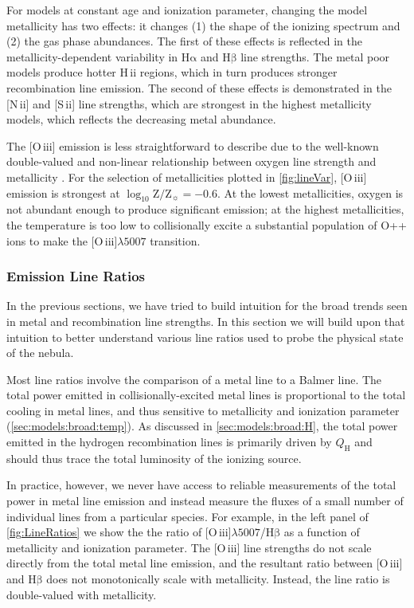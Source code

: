 \documentclass[twocolumn, tighten]{aastex61}
\newcommand{\Fig}[1]{\autoref{fig:#1}}
\newcommand{\Sec}[1]{\autoref{sec:#1}}
\newcommand{\logten}{\ensuremath{\log_{10}}}
\newcommand{\nii}{[N\,{\sc ii}]\xspace}
\newcommand{\sii}{[S\,{\sc ii}]\xspace}
\newcommand{\oiii}{[O\,{\sc iii}]\xspace}
\newcommand{\ha}{\ensuremath{\mathrm{H\alpha}}}
\newcommand{\hb}{\ensuremath{\mathrm{H\beta}}}
\newcommand{\hii}{H\,{\sc ii}\xspace}
\newcommand\lam[1]{\ensuremath{\lambda #1}}
\newcommand{\logZeq}[1]{\ensuremath{\logten \mathrm{Z}/\mathrm{Z}_{\sun} = #1}}
\newcommand{\QH}{\ensuremath{Q_{\mathrm{H}}}}
\newcommand\oiiihb{\oiii{}\lam{5007}/\hb{}}
\begin{document}
For models at constant age and ionization parameter, changing the model metallicity has two effects: it changes (1) the shape of the ionizing spectrum and (2) the gas phase abundances. The first of these effects is reflected in the metallicity-dependent variability in \ha{} and \hb{} line strengths. The metal poor models produce hotter \hii regions, which in turn produces stronger recombination line emission. The second of these effects is demonstrated in the \nii{} and \sii{} line strengths, which are strongest in the highest metallicity models, which reflects the decreasing metal abundance.

The \oiii{} emission is less straightforward to describe due to the well-known double-valued and non-linear relationship between oxygen line strength and metallicity \citep{Pilyugin05, Kewley08}. For the selection of metallicities plotted in \Fig{lineVar}, \oiii{} emission is strongest at \logZeq{-0.6}. At the lowest metallicities, oxygen is not abundant enough to produce significant emission; at the highest metallicities, the temperature is too low to collisionally excite a substantial population of O++ ions to make the \oiii{}\lam{5007} transition. 

\subsubsection{Emission Line Ratios}\label{sec:models:lines:ratios}

In the previous sections, we have tried to build intuition for the broad trends seen in metal and recombination line strengths. In this section we will build upon that intuition to better understand various line ratios used to probe the physical state of the nebula.

Most line ratios involve the comparison of a metal line to a Balmer line. The total power emitted in collisionally-excited metal lines is proportional to the total cooling in metal lines, and thus sensitive to metallicity and ionization parameter (\Sec{models:broad:temp}). As discussed in \Sec{models:broad:H}, the total power emitted in the hydrogen recombination lines is primarily driven by \QH{} and should thus trace the total luminosity of the ionizing source. 

In practice, however, we never have access to reliable measurements of the total power in metal line emission and instead measure the fluxes of a small number of individual lines from a particular species. For example, in the left panel of \Fig{LineRatios} we show the the ratio of \oiiihb{} as a function of metallicity and ionization parameter. The \oiii{} line strengths do not scale directly from the total metal line emission, and the resultant ratio between \oiii{} and \hb{} does not monotonically scale with metallicity. Instead, the line ratio is double-valued with metallicity.
\end{document}

